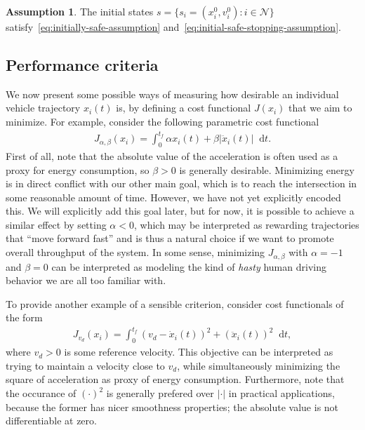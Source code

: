 \documentclass[a4paper]{report}
\newcounter{mycomment}
\newcommand{\comment}[2][]{%
    \refstepcounter{mycomment}%
    {%
        \setstretch{0.7}%
        \StrLeft{#2}{60}[\shortcaption]%
        \todo[%
        color={red!100!green!33},%
        size=\small,%
        caption={\protect\hypertarget{todo\themycomment}{}\textit{\thesubsection}%
        \hspace{1.0em}{\shortcaption}~\textit{[\themycomment]}}, #1]%
        {%
        #2~\hyperlink{todo\themycomment}{\textit{[\themycomment]}}}
    }%
}
\theoremstyle{definition}
\newtheorem{assump}{Assumption}[chapter]
\theoremstyle{plain}
\newcommand*\diff{\mathop{}\!\mathrm{d}}
\begin{document}
\begin{assump}\label{assump:feasible}
  The initial states $s=\{s_i = (x_i^0,v_i^0) : i \in \mathcal{N} \}$
  satisfy~\eqref{eq:initially-safe-assumption}
  and~\eqref{eq:initial-safe-stopping-assumption}.
\end{assump}


\subsection{Performance criteria}\label{sec:criteria}
We now present some possible ways of measuring how desirable an individual
vehicle trajectory $x_{i}(t)$ is, by defining a cost functional $J(x_{i})$ that
we aim to minimize.
%
For example, consider the following parametric cost functional
\begin{align}
  J_{\alpha,\beta}(x_{i}) = \int_{0}^{t_{f}} \alpha x_{i}(t) + \beta |\ddot{x}_{i}(t)| \diff t .
\end{align}
%
First of all, note that the absolute value of the acceleration is often used as
a proxy for energy consumption, so $\beta > 0$ is generally desirable.
%
%
Minimizing energy is in direct conflict with our other main goal, which is to
reach the intersection in some reasonable amount of time. However, we have not
yet explicitly encoded this.
%
We will explicitly add this goal later, but for now, it is possible to achieve a
similar effect by setting $\alpha < 0$, which may be interpreted as rewarding
trajectories that ``move forward fast'' and is thus a natural choice if we want
to promote overall throughput of the system.
%
In some sense, minimizing $J_{\alpha,\beta}$ with $\alpha = -1$ and $\beta = 0$ can be interpreted
as modeling the kind of \emph{hasty} human driving behavior we are all too familiar with.

To provide another example of a sensible criterion, consider cost functionals of
the form
\begin{align}\label{eq:energy-objective}
  J_{v_{d}}(x_{i}) = \int_{0}^{t_{f}} {(v_{d} - \dot{x}_{i}(t))}^{2} + {(\ddot{x}_{i}(t))}^{2} \diff t ,
\end{align}
where $v_{d} > 0$ is some reference velocity. This objective can be interpreted
as trying to maintain a velocity close to $v_{d}$, while simultaneously
minimizing the square of acceleration as proxy of energy consumption.
%
Furthermore, note that the occurance of $(\cdot)^2$ is generally prefered over
$|\cdot|$ in practical applications, because the former has nicer smoothness
properties; the absolute value is not differentiable at zero.
\end{document}
